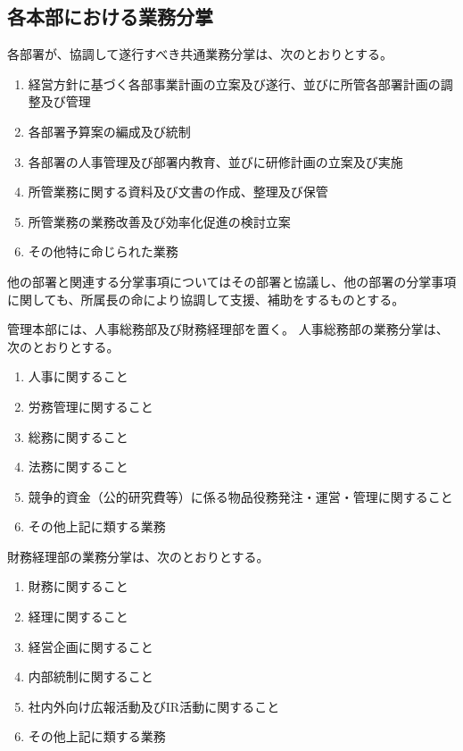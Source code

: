 \documentclass[10pt,a4paper,uplatex,dvipdfmx]{jsarticle}
\begin{document}
\subsection{各本部における業務分掌}
各部署が、協調して遂行すべき共通業務分掌は、次のとおりとする。
\begin{enumerate}
	\item 経営方針に基づく各部事業計画の立案及び遂行、並びに所管各部署計画の調整及び管理
	\item 各部署予算案の編成及び統制
	\item 各部署の人事管理及び部署内教育、並びに研修計画の立案及び実施
	\item 所管業務に関する資料及び文書の作成、整理及び保管
	\item 所管業務の業務改善及び効率化促進の検討立案
	\item その他特に命じられた業務
\end{enumerate}
\term 他の部署と関連する分掌事項についてはその部署と協議し、他の部署の分掌事項に関しても、所属長の命により協調して支援、補助をするものとする。

管理本部には、人事総務部及び財務経理部を置く。
\term 人事総務部の業務分掌は、次のとおりとする。
\begin{enumerate}
	\item 人事に関すること
	\item 労務管理に関すること
	\item 総務に関すること
	\item 法務に関すること
	\item 競争的資金（公的研究費等）に係る物品役務発注・運営・管理に関すること
	\item その他上記に類する業務    
\end{enumerate}

\term 財務経理部の業務分掌は、次のとおりとする。
\begin{enumerate}
	\item 財務に関すること
	\item 経理に関すること
	\item 経営企画に関すること
	\item 内部統制に関すること
	\item 社内外向け広報活動及びIR活動に関すること
	\item その他上記に類する業務
\end{enumerate}
\end{document}
